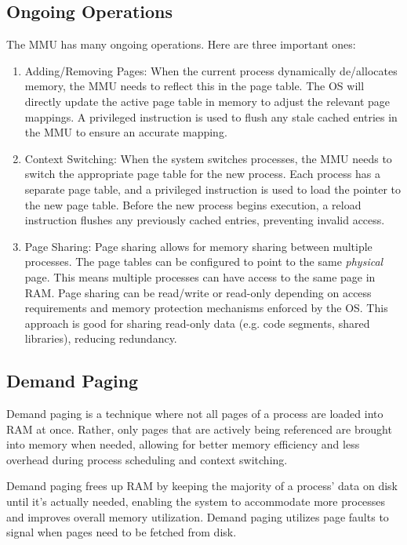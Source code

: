 \documentclass{report}
\begin{document}
\subsection{Ongoing Operations}
The MMU has many ongoing operations. Here are three important ones:
\begin{enumerate}[label=\textit{(\roman*)}]
\item Adding/Removing Pages: When the current process dynamically de/allocates memory, the MMU
  needs to reflect this in the page table. The OS will directly update the active page table in
  memory to adjust the relevant page mappings. A privileged instruction is used to flush any stale
  cached entries in the MMU to ensure an accurate mapping.
\item Context Switching: When the system switches processes, the MMU needs to switch the appropriate
  page table for the new process. Each process has a separate page table, and a privileged
  instruction is used to load the pointer to the new page table. Before the new process begins
  execution, a reload instruction flushes any previously cached entries, preventing invalid access.
\item Page Sharing: Page sharing allows for memory sharing between multiple processes. The page
  tables can be configured to point to the same \textit{physical} page. This means multiple
  processes can have access to the same page in RAM. Page sharing can be read/write or read-only
  depending on access requirements and memory protection mechanisms enforced by the OS. This
  approach is good for sharing read-only data (e.g. code segments, shared libraries), reducing
  redundancy.
\end{enumerate}


\subsection{Demand Paging}
Demand paging is a technique where not all pages of a process are loaded into RAM at once. Rather,
only pages that are actively being referenced are brought into memory when needed, allowing for
better memory efficiency and less overhead during process scheduling and context switching.

Demand paging frees up RAM by keeping the majority of a process' data on disk until it's actually
needed, enabling the system to accommodate more processes and improves overall memory
utilization. Demand paging utilizes page faults to signal when pages need to be fetched from disk. 
\end{document}
